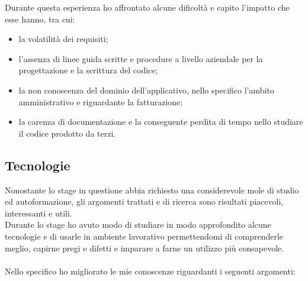 	Durante questa esperienza ho affrontato alcune dificoltà e capito l'impatto che esse hanno, tra cui:
	\begin{itemize}
		\item la volatilità dei requisiti;
		\item l'assenza di linee guida scritte e procedure a livello aziendale per la progettazione e la scrittura del codice;
		\item la non conoscenza del dominio dell'applicativo, nello specifico l'ambito amministrativo e riguardante la fatturazione;
		\item la carenza di documentazione e la conseguente perdita di tempo nello studiare il codice prodotto da terzi.
	\end{itemize}
	
	\subsection{Tecnologie}
	\label{sub:tecnologie}
	Nonostante lo stage in questione abbia richiesto una considerevole mole di studio ed
	autoformazione, gli argomenti trattati e di ricerca sono risultati piacevoli, interessanti e
	utili. \\
	Durante lo stage ho avuto modo di studiare in modo approfondito alcune tecnologie e di usarle in ambiente lavorativo permettendomi di comprenderle meglio, capirne pregi e difetti e imparare a farne un utilizzo più consapevole. \\ \\
	Nello specifico ho migliorato le mie conoscenze riguardanti i seguenti argomenti:
